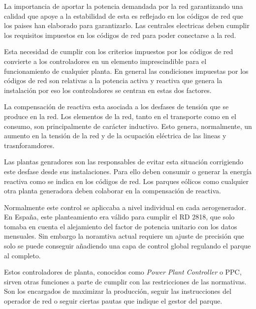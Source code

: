 \documentclass{book}
\begin{document}
La importancia de aportar la potencia demandada por la red garantizando una calidad que apoye a la estabilidad de esta es reflejado en los c\'odigos de red que los paises han elaborado para garantizarlo. Las centrales electricas deben cumplir los requisitos impuestos en los c\'odigos de red para poder conectarse a la red. \par

Esta necesidad de cumplir con los criterios impuestos por los c\'odigos de red convierte a los controladores en un elemento imprescindible para el funcionamiento de cualquier planta. En general las condiciones impuestas por los c\'odigos de red son relativas a la potencia activa y reactiva que genera la instalaci\'on por eso los controladores se centran en estas dos factores. \par

La compensaci\'on de reactiva esta asociada a los desfases de tensi\'on que se produce en la red. Los elementos de la red, tanto en el transporte como en el consumo, son principalmente de car\'acter inductivo. Esto genera, normalmente, un aumento en la tensi\'on de la red y de la ocupaci\'on el\'ectrica de las lineas y trasnforamdores. \par

Las plantas genradores son las responsables de evitar esta situaci\'on corrigiendo este desfase desde sus instalaciones. Para ello deben consumir o generar la energ\'ia reactiva como se indica en los c\'odigos de red. Los parques e\'olicos como cualquier otra planta generadora deben colaborar en la compensaci\'on de reactiva. \par

Normalmente este control se apliccaba a nivel individual en cada aerogenerador. En España, este planteamiento era v\'alido para cumplir el RD 2818, que solo tomaba en cuenta el alejamiento del factor de potencia unitario con los datos mensuales. Sin embargo la noramtiva actual requiere un ajuste de precisi\'on que solo se puede conseguir añadiendo una capa de control global regulando el parque al completo. \par

Estos controladores de planta, conocidos como \emph{Power Plant Controller} o PPC, sirven otras funciones a parte de cumplir con las restricciones de las normativas. Son los encargados de maximizar la producci\'on, seguir las instrucciones del operador de red o seguir ciertas pautas que indique el gestor del parque. \par
\end{document}

